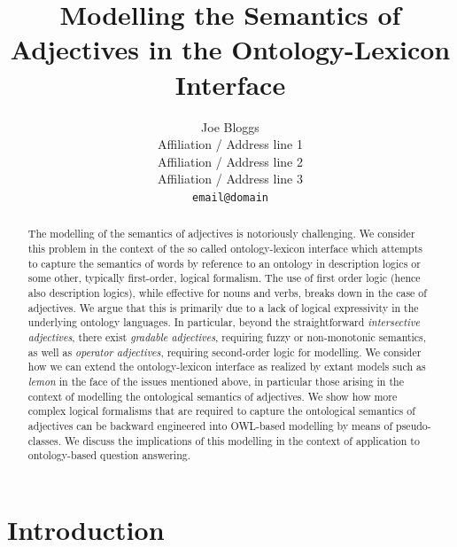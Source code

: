 \documentclass[11pt]{article}
\title{Modelling the Semantics of Adjectives in the Ontology-Lexicon Interface}
\author{Joe Bloggs\\
  Affiliation / Address line 1 \\
  Affiliation / Address line 2 \\
  Affiliation / Address line 3 \\
  {\tt email@domain}}
\date{}
\begin{document}
\maketitle
\begin{abstract}
The modelling of the semantics of adjectives is notoriously challenging. We consider this problem in the context of the so called ontology-lexicon interface which attempts to capture the semantics of words by reference to an ontology in description logics or some other, typically first-order, logical formalism.
The use of first order logic (hence also description logics),
while effective for nouns and verbs, breaks down in the case of adjectives. 
We argue that this is primarily due to a lack of logical expressivity in the 
underlying ontology languages. In particular, beyond the straightforward \emph{intersective adjectives}, there exist \emph{gradable adjectives}, requiring fuzzy or
non-monotonic semantics, as well as \emph{operator adjectives}, requiring second-order logic for modelling. 
We consider how we can extend the ontology-lexicon interface as realized by extant models such as \emph{lemon} in the face of the issues mentioned above, in particular those arising in the context of modelling the ontological semantics of adjectives. We show how more complex logical formalisms that are required to capture the ontological semantics of adjectives can be backward 
engineered into OWL-based modelling by means of pseudo-classes. We discuss the implications of this modelling in the context of application to ontology-based question answering.
\end{abstract}



\section{Introduction}
\label{intro}
\end{document}
